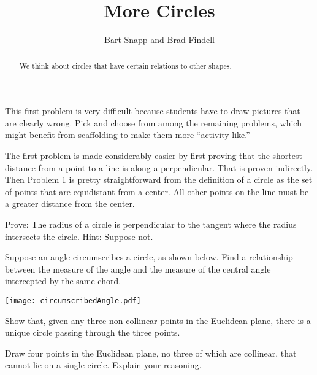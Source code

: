 \documentclass[nooutcomes]{ximera}
\title{More Circles}
\author{Bart Snapp and Brad Findell}
\begin{document}
\begin{abstract}
  We think about circles that have certain relations to other shapes.
\end{abstract}
\maketitle

\begin{teachingnote}
This first problem is very difficult because students have to draw pictures that are clearly wrong.  Pick and choose from among the remaining problems, which might benefit from scaffolding to make them more ``activity like.''

The first problem is made considerably easier by first proving that the shortest distance from a point to a line is along a perpendicular.  That is proven indirectly.  Then Problem 1 is pretty straightforward from the definition of a circle as the set of points that are equidistant from a center.  All other points on the line must be a greater distance from the center.
\end{teachingnote}

\begin{problem}
Prove: The radius of a circle is perpendicular to the tangent where the radius intersects the circle.  Hint:  Suppose not. 
\vfill
\end{problem}

\begin{problem}
Suppose an angle circumscribes a circle, as shown below.  Find a relationship between the measure of the angle and the measure of the central angle intercepted by the same chord.
\begin{image}
\texttt{[image: circumscribedAngle.pdf]}
\end{image}
\vfill
\end{problem}

\newpage

\begin{problem}
Show that, given any three non-collinear points in the Euclidean
plane, there is a unique circle passing through the three points.
\vfill
\end{problem}

\begin{problem}
Draw four points in the Euclidean plane, no three of which are collinear, that cannot lie on a single circle.  Explain your reasoning. 
\vfill
\end{problem}
\end{document}

